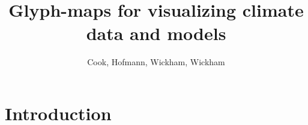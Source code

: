 \documentclass[oneside]{article}
\begin{document}
\title{Glyph-maps for visualizing climate data and models}
\author{Cook, Hofmann, Wickham, Wickham}



%
%
\maketitle

\section{Introduction}
\end{document}

